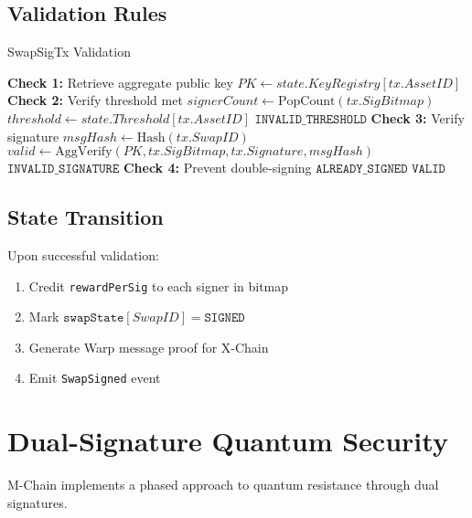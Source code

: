 \documentclass[11pt]{article}
\begin{document}
\subsection{Validation Rules}

\begin{algorithm}[H]
\caption{SwapSigTx Validation}
\begin{algorithmic}[1]
    \State \textbf{Check 1:} Retrieve aggregate public key
    \State $PK \gets state.KeyRegistry[tx.AssetID]$
    \State
    \State \textbf{Check 2:} Verify threshold met
    \State $signerCount \gets \text{PopCount}(tx.SigBitmap)$
    \State $threshold \gets state.Threshold[tx.AssetID]$
        \State \Return $\texttt{INVALID\_THRESHOLD}$
    \EndIf
    \State
    \State \textbf{Check 3:} Verify signature
    \State $msgHash \gets \text{Hash}(tx.SwapID)$
    \State $valid \gets \text{AggVerify}(PK, tx.SigBitmap, tx.Signature, msgHash)$
        \State \Return $\texttt{INVALID\_SIGNATURE}$
    \EndIf
    \State
    \State \textbf{Check 4:} Prevent double-signing
        \State \Return $\texttt{ALREADY\_SIGNED}$
    \EndIf
    \State
    \State \Return $\texttt{VALID}$
\EndFunction
\end{algorithmic}
\end{algorithm}

\subsection{State Transition}

Upon successful validation:
\begin{enumerate}
\item Credit \texttt{rewardPerSig} to each signer in bitmap
\item Mark $\texttt{swapState}[SwapID] = \texttt{SIGNED}$
\item Generate Warp message proof for X-Chain
\item Emit \texttt{SwapSigned} event
\end{enumerate}

\section{Dual-Signature Quantum Security}

M-Chain implements a phased approach to quantum resistance through dual signatures.
\end{document}
